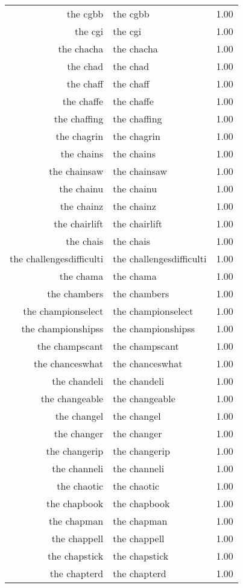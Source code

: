 \begin{table}[ht]
\begin{tabular}{rlr}
  the cgbb & the cgbb & 1.00 \\ 
  the cgi & the cgi & 1.00 \\ 
  the chacha & the chacha & 1.00 \\ 
  the chad & the chad & 1.00 \\ 
  the chaff & the chaff & 1.00 \\ 
  the chaffe & the chaffe & 1.00 \\ 
  the chaffing & the chaffing & 1.00 \\ 
  the chagrin & the chagrin & 1.00 \\ 
  the chains & the chains & 1.00 \\ 
  the chainsaw & the chainsaw & 1.00 \\ 
  the chainu & the chainu & 1.00 \\ 
  the chainz & the chainz & 1.00 \\ 
  the chairlift & the chairlift & 1.00 \\ 
  the chais & the chais & 1.00 \\ 
  the challengesdifficulti & the challengesdifficulti & 1.00 \\ 
  the chama & the chama & 1.00 \\ 
  the chambers & the chambers & 1.00 \\ 
  the championselect & the championselect & 1.00 \\ 
  the championshipss & the championshipss & 1.00 \\ 
  the champscant & the champscant & 1.00 \\ 
  the chanceswhat & the chanceswhat & 1.00 \\ 
  the chandeli & the chandeli & 1.00 \\ 
  the changeable & the changeable & 1.00 \\ 
  the changel & the changel & 1.00 \\ 
  the changer & the changer & 1.00 \\ 
  the changerip & the changerip & 1.00 \\ 
  the channeli & the channeli & 1.00 \\ 
  the chaotic & the chaotic & 1.00 \\ 
  the chapbook & the chapbook & 1.00 \\ 
  the chapman & the chapman & 1.00 \\ 
  the chappell & the chappell & 1.00 \\ 
  the chapstick & the chapstick & 1.00 \\ 
  the chapterd & the chapterd & 1.00 \\ 

\end{tabular}
\end{table}
